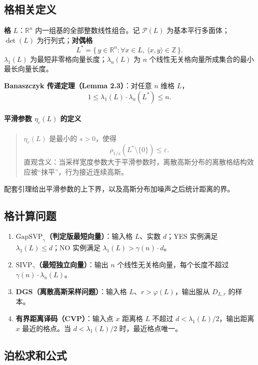 \documentclass[11pt,a4paper]{article}
\newcommand{\R}{\mathbb{R}}
\newcommand{\Z}{\mathbb{Z}}
\begin{document}
\subsection{格相关定义}

\textbf{格} $L$：$\R^{n}$ 内一组基的全部整数线性组合。记 $\mathcal{P}(L)$ 为基本平行多面体；$\det(L)$ 为行列式；\textbf{对偶格}
\[
  L^{*}=\{\,y\in\R^{n}:\forall x\in L,\ \langle x,y\rangle\in\Z\,\}.
\]
$\lambda_{1}(L)$ 为最短非零格向量长度；$\lambda_{n}(L)$ 为 $n$ 个线性无关格向量所成集合的最小最长向量长度。

\textbf{Banaszczyk 传递定理（Lemma 2.3）}：对任意 $n$ 维格 $L$，
\[
  1\le \lambda_{1}(L)\cdot\lambda_{n}(L^{*})\le n.
\]

\paragraph*{平滑参数 $\eta_{\varepsilon}(L)$ 的定义}

\begin{quote}
$\eta_{\varepsilon}(L)$ 是最小的 $s>0$，使得
\[
  \rho_{1/s}(L^{*}\setminus\{0\})\le \varepsilon.
\]
直观含义：当采样宽度参数大于平滑参数时，离散高斯分布的离散格结构效应被``抹平''，行为接近连续高斯。
\end{quote}

配套引理给出平滑参数的上下界，以及高斯分布加噪声之后统计距离的界。

\subsection{格计算问题}

\begin{enumerate}[label=\arabic*.]
  \item \textbf{$\mathrm{GapSVP}_{\gamma}$（判定版最短向量）}：输入格 $L$、实数 $d$；YES 实例满足 $\lambda_{1}(L)\le d$；NO 实例满足 $\lambda_{1}(L)>\gamma(n)\cdot d$。
  \item \textbf{$\mathrm{SIVP}_{\gamma}$（最短独立向量）}：输出 $n$ 个线性无关格向量，每个长度不超过 $\gamma(n)\cdot\lambda_{n}(L)$。
  \item \textbf{DGS（离散高斯采样问题）}：输入格 $L$、$r>\varphi(L)$，输出服从 $D_{L,r}$ 的样本。
  \item \textbf{有界距离译码（CVP）}：输入点 $x$ 距离格 $L$ 不超过 $d<\lambda_{1}(L)/2$，输出距离 $x$ 最近的格点。当 $d<\lambda_{1}(L)/2$ 时，最近格点唯一。
\end{enumerate}

\subsection{泊松求和公式}
\end{document}
